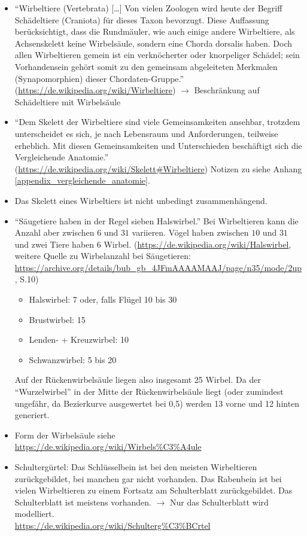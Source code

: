 \begin{itemize}
 \item "`Wirbeltiere (Vertebrata) [\dots] Von vielen Zoologen wird heute der Begriff Schädeltiere (Craniota) für dieses Taxon bevorzugt. Diese Auffassung berücksichtigt, dass die Rundmäuler, wie auch einige andere Wirbeltiere, als Achsenskelett keine Wirbelsäule, sondern eine Chorda dorsalis haben. Doch allen Wirbeltieren gemein ist ein verknöcherter oder knorpeliger Schädel; sein Vorhandensein gehört somit zu den gemeinsam abgeleiteten Merkmalen (Synapomorphien) dieser Chordaten-Gruppe."' (\url{https://de.wikipedia.org/wiki/Wirbeltiere}) $\rightarrow$ Beschränkung auf Schädeltiere mit Wirbelsäule
 \item "`Dem Skelett der Wirbeltiere sind viele Gemeinsamkeiten ansehbar, trotzdem unterscheidet es sich, je nach Lebensraum und Anforderungen, teilweise erheblich. Mit diesen Gemeinsamkeiten und Unterschieden beschäftigt sich die Vergleichende Anatomie."' (\url{https://de.wikipedia.org/wiki/Skelett#Wirbeltiere}) Notizen zu \cite{Vergleichende_Anatomie} siehe Anhang \ref{appendix_vergleichende_anatomie}.
 \item Das Skelett eines Wirbeltiers ist nicht unbedingt zusammenhängend.
 
 \item "`Säugetiere haben in der Regel sieben Halswirbel."' Bei Wirbeltieren kann die Anzahl aber zwischen $6$ und $31$ variieren. Vögel haben zwischen $10$ und $31$ und zwei Tiere haben $6$ Wirbel. (\url{https://de.wikipedia.org/wiki/Halswirbel}, weitere Quelle zu Wirbelanzahl bei Säugetieren: \url{https://archive.org/details/bub_gb_4JFmAAAAMAAJ/page/n35/mode/2up}, S.10)
    \begin{itemize}
     \item Halswirbel: 7 oder, falls Flügel 10 bis 30
     \item Brustwirbel: 15
     \item Lenden- + Kreuzwirbel: 10
     \item Schwanzwirbel: 5 bis 20
    \end{itemize}
 Auf der Rückenwirbelsäule liegen also insgesamt 25 Wirbel.   
 Da der "`Wurzelwirbel"' in der Mitte der Rückenwirbelsäule liegt (oder zumindest ungefähr, da Bezierkurve ausgewertet bei 0,5) werden 13 vorne und 12 hinten generiert.

 
 \item Form der Wirbelsäule siehe \url{https://de.wikipedia.org/wiki/Wirbels\%C3\%A4ule}
 
 \item Schultergürtel: Das Schlüsselbein ist bei den meisten Wirbeltieren zurückgebildet, bei manchen gar nicht vorhanden. Das Rabenbein ist bei vielen Wirbeltieren zu einem Fortsatz am Schulterblatt zurückgebildet. Das Schulterblatt ist meistens vorhanden. $\rightarrow$ Nur das Schulterblatt wird modelliert.\\
 \url{https://de.wikipedia.org/wiki/Schulterg\%C3\%BCrtel}
\end{itemize}
